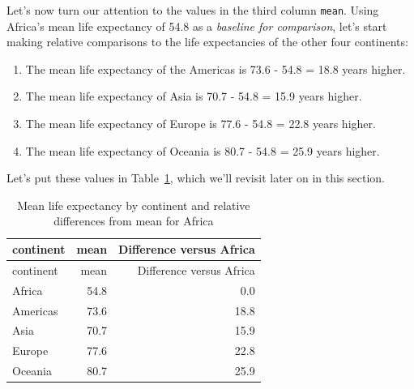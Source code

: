 \documentclass[
  letterpaper,
  DIV=11,
  numbers=noendperiod]{scrreprt}
\theoremstyle{definition}
\theoremstyle{remark}
\begin{document}
Let's now turn our attention to the values in the third column
\texttt{mean}. Using Africa's mean life expectancy of 54.8 as a
\emph{baseline for comparison}, let's start making relative comparisons
to the life expectancies of the other four continents:

\begin{enumerate}
\def\labelenumi{\arabic{enumi}.}
\item
  The mean life expectancy of the Americas is 73.6 - 54.8 = 18.8 years
  higher.
\item
  The mean life expectancy of Asia is 70.7 - 54.8 = 15.9 years higher.
\item
  The mean life expectancy of Europe is 77.6 - 54.8 = 22.8 years higher.
\item
  The mean life expectancy of Oceania is 80.7 - 54.8 = 25.9 years
  higher.
\end{enumerate}

Let's put these values in
Table~\ref{tbl-continent-mean-life-expectancies}, which we'll revisit
later on in this section.

\hypertarget{tbl-continent-mean-life-expectancies}{}
\begin{longtable}[]{@{}lrr@{}}
\caption{\label{tbl-continent-mean-life-expectancies}Mean life
expectancy by continent and relative differences from mean for
Africa}\tabularnewline
\toprule\noalign{}
continent & mean & Difference versus Africa \\
\midrule\noalign{}
\endfirsthead
\toprule\noalign{}
continent & mean & Difference versus Africa \\
\midrule\noalign{}
\endhead
\bottomrule\noalign{}
\endlastfoot
Africa & 54.8 & 0.0 \\
Americas & 73.6 & 18.8 \\
Asia & 70.7 & 15.9 \\
Europe & 77.6 & 22.8 \\
Oceania & 80.7 & 25.9 \\
\end{longtable}
\end{document}
